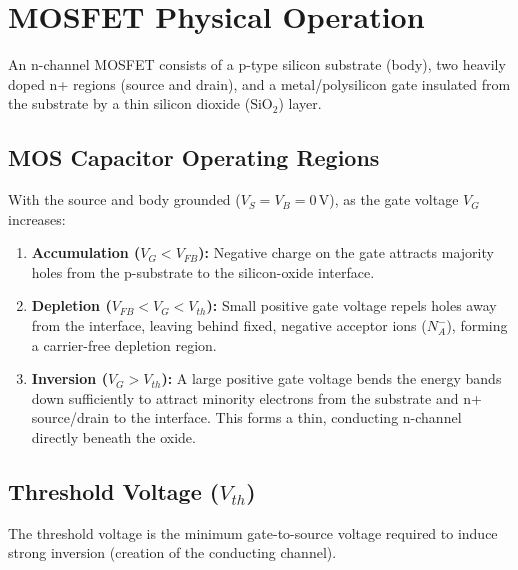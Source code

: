 \documentclass[12pt,a4paper]{article}
\begin{document}
\section{MOSFET Physical Operation}

An n-channel MOSFET consists of a p-type silicon substrate (body), two heavily doped n+ regions (source and drain), and a metal/polysilicon gate insulated from the substrate by a thin silicon dioxide ($\text{SiO}_2$) layer.

\subsection{MOS Capacitor Operating Regions}
With the source and body grounded ($V_S = V_B = 0\,\text{V}$), as the gate voltage $V_G$ increases:
\begin{enumerate}[label=\alph*., leftmargin=*]
  \item \textbf{Accumulation ($V_G < V_{FB}$):} Negative charge on the gate attracts majority holes from the p-substrate to the silicon-oxide interface.
  \item \textbf{Depletion ($V_{FB} < V_G < V_{th}$):} Small positive gate voltage repels holes away from the interface, leaving behind fixed, negative acceptor ions ($N_A^-$), forming a carrier-free depletion region.
  \item \textbf{Inversion ($V_G > V_{th}$):} A large positive gate voltage bends the energy bands down sufficiently to attract minority electrons from the substrate and n+ source/drain to the interface. This forms a thin, conducting n-channel directly beneath the oxide.
\end{enumerate}

\subsection{Threshold Voltage ($V_{th}$)}
The threshold voltage is the minimum gate-to-source voltage required to induce strong inversion (creation of the conducting channel).
\end{document}
